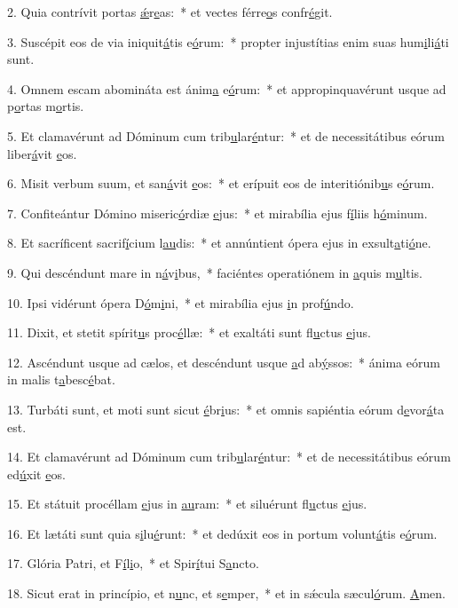 2. Quia contrívit portas \uline{ǽ}r\uline{e}as:~* et vectes férre\uline{o}s confr\uline{é}git.\par 
3. Suscépit eos de via iniquit\uline{á}tis e\uline{ó}rum:~* propter injustítias enim suas hum\uline{i}li\uline{á}ti sunt.\par 
4. Omnem escam abomináta est ánim\uline{a} e\uline{ó}rum:~* et appropinquavérunt usque ad p\uline{o}rtas m\uline{o}rtis.\par 
5. Et clamavérunt ad Dóminum cum trib\uline{u}lar\uline{é}ntur:~* et de necessitátibus eórum liber\uline{á}vit \uline{e}os.\par 
6. Misit verbum suum, et san\uline{á}vit \uline{e}os:~* et erípuit eos de interitiónib\uline{u}s e\uline{ó}rum.\par 
7. Confiteántur Dómino miseric\uline{ó}rdiæ \uline{e}jus:~* et mirabília ejus f\uline{í}liis h\uline{ó}minum.\par 
8. Et sacríficent sacrif\uline{í}cium l\uline{au}dis:~* et annúntient ópera ejus in exsult\uline{a}ti\uline{ó}ne.\par 
9. Qui descéndunt mare in n\uline{á}v\uline{i}bus,~* faciéntes operatiónem in \uline{a}quis m\uline{u}ltis.\par 
10. Ipsi vidérunt ópera D\uline{ó}m\uline{i}ni,~* et mirabília ejus \uline{i}n prof\uline{ú}ndo.\par 
11. Dixit, et stetit spírit\uline{u}s proc\uline{é}llæ:~* et exaltáti sunt fl\uline{u}ctus \uline{e}jus.\par 
12. Ascéndunt usque ad cælos, et descéndunt usque \uline{a}d ab\uline{ý}ssos:~* ánima eórum in malis t\uline{a}besc\uline{é}bat.\par 
13. Turbáti sunt, et moti sunt sicut \uline{é}br\uline{i}us:~* et omnis sapiéntia eórum d\uline{e}vor\uline{á}ta est.\par 
14. Et clamavérunt ad Dóminum cum trib\uline{u}lar\uline{é}ntur:~* et de necessitátibus eórum ed\uline{ú}xit \uline{e}os.\par 
15. Et státuit procéllam \uline{e}jus in \uline{au}ram:~* et siluérunt fl\uline{u}ctus \uline{e}jus.\par 
16. Et lætáti sunt quia s\uline{i}lu\uline{é}runt:~* et dedúxit eos in portum volunt\uline{á}tis e\uline{ó}rum.\par 
17. Glória Patri, et F\uline{í}l\uline{i}o,~* et Spir\uline{í}tui S\uline{a}ncto.\par 
18. Sicut erat in princípio, et n\uline{u}nc, et s\uline{e}mper,~* et in sǽcula sæcul\uline{ó}rum. \uline{A}men.\par 
